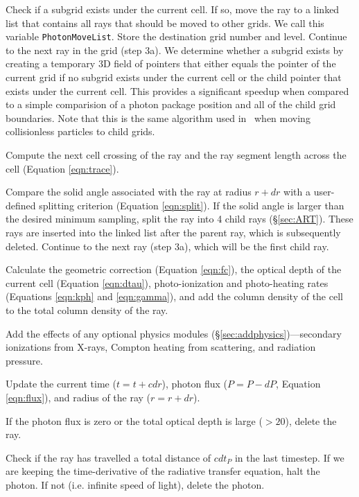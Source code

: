 \documentclass[12pt,preprint]{aastex}
\begin{document}
 Check if a subgrid exists under the current cell.  If so,
move the ray to a linked list that contains all rays that should be
moved to other grids.  We call this variable \texttt{PhotonMoveList}.
Store the destination grid number and level.  Continue to the next ray
in the grid (step 3a).  We determine whether a subgrid exists by
creating a temporary 3D field of pointers that either equals the
pointer of the current grid if no subgrid exists under the current
cell or the child pointer that exists under the current cell.  This
provides a significant speedup when compared to a simple comparision
of a photon package position and all of the child grid boundaries.
Note that this is the same algorithm used in \enzo~when moving
collisionless particles to child grids.

 Compute the next cell crossing of the ray and the ray
segment length across the cell (Equation \ref{eqn:trace}).

 Compare the solid angle associated with the ray at radius
$r+dr$ with a user-defined splitting criterion (Equation
\ref{eqn:split}).  If the solid angle is larger than the desired
minimum sampling, split the ray into 4 child rays (\S\ref{sec:ART}).
These rays are inserted into the linked list after the parent ray,
which is subsequently deleted.  Continue to the next ray (step 3a),
which will be the first child ray.

 Calculate the geometric correction (Equation \ref{eqn:fc}),
the optical depth of the current cell (Equation \ref{eqn:dtau}),
photo-ionization and photo-heating rates (Equations \ref{eqn:kph} and
\ref{eqn:gamma}), and add the column density of the cell to the total
column density of the ray.

 Add the effects of any optional physics modules
(\S\ref{sec:addphysics})---secondary ionizations from X-rays, Compton
heating from scattering, and radiation pressure.

 Update the current time ($t = t + cdr$), photon flux ($P = P
- dP$, Equation \ref{eqn:flux}), and radius of the ray ($r = r + dr$).

 If the photon flux is zero or the total optical depth is
large ($>20$), delete the ray.

 Check if the ray has travelled a total distance of $c dt_P$
in the last timestep.  If we are keeping the time-derivative of the
radiative transfer equation, halt the photon.  If not (i.e. infinite
speed of light), delete the photon.
\end{document}
